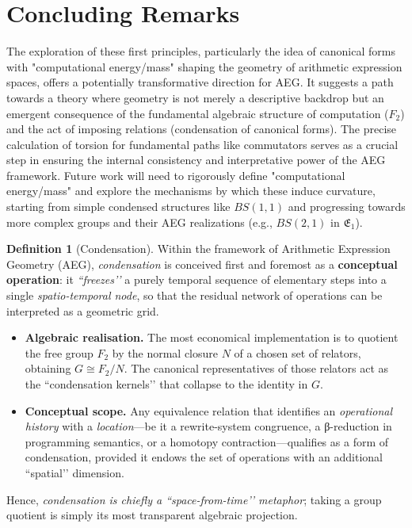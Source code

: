 \documentclass[12pt, a4paper]{article}
\theoremstyle{definition}
\newtheorem{definition}{Definition}[section]
\begin{document}
\section{Concluding Remarks}
The exploration of these first principles, particularly the idea of canonical forms with "computational energy/mass" shaping the geometry of arithmetic expression spaces, offers a potentially transformative direction for AEG. It suggests a path towards a theory where geometry is not merely a descriptive backdrop but an emergent consequence of the fundamental algebraic structure of computation ($F_2$) and the act of imposing relations (condensation of canonical forms). The precise calculation of torsion for fundamental paths like commutators serves as a crucial step in ensuring the internal consistency and interpretative power of the AEG framework. Future work will need to rigorously define "computational energy/mass" and explore the mechanisms by which these induce curvature, starting from simple condensed structures like $BS(1,1)$ and progressing towards more complex groups and their AEG realizations (e.g., $BS(2,1)$ in $\mathfrak{E}_1$).

\begin{definition}[Condensation]
Within the framework of Arithmetic Expression Geometry (AEG),
\emph{condensation} is conceived first and foremost as a \textbf{conceptual operation}:
it \textit{“freezes’’} a purely temporal sequence of elementary steps into a single
\emph{spatio-temporal node}, so that the residual network of operations can be interpreted as a
geometric grid.

\begin{itemize}
  \item \textbf{Algebraic realisation.}
        The most economical implementation is to quotient the free group
        $F_{2}$ by the normal closure $N$ of a chosen set of relators, obtaining
        $G \cong F_{2}/N$.
        The canonical representatives of those relators act as the “condensation kernels’’
        that collapse to the identity in $G$.

  \item \textbf{Conceptual scope.}
        Any equivalence relation that identifies an \emph{operational history} with a
        \emph{location}—be it a rewrite-system congruence, a β-reduction in programming
        semantics, or a homotopy contraction—qualifies as a form of condensation,
        provided it endows the set of operations with an additional “spatial’’ dimension.
\end{itemize}

Hence, \emph{condensation is chiefly a “space-from-time’’ metaphor};
taking a group quotient is simply its most transparent algebraic projection.
\end{definition}

% 
% 
\end{document}
